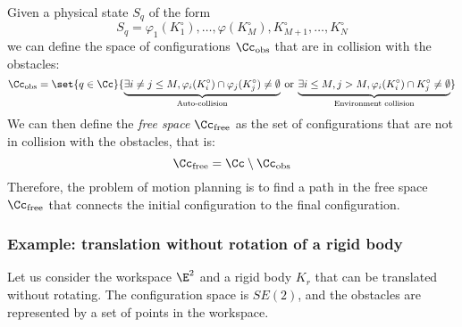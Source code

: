 Given a physical state $S_q$ of the form
\begin{equation*}
    S_q = \varphi_1(K_1^\circ), \dots, \varphi(K_M^\circ), K_{M+1}^\circ, \dots, K_N^\circ
\end{equation*}
we can define the space of configurations $\Cc_{\text{obs}}$ that are in collision with the obstacles:
\begin{equation*}
    \Cc_{\text{obs}} = \set{q\in\Cc}{%
        \underbrace{\exists i\neq j\leq M, \varphi_i(K_i^\circ)\cap \varphi_j(K_j^\circ)\neq\emptyset}_{\text{Auto-collision}}%
        \:\text{or}\:%
        \underbrace{\exists i\leq M, j>M, \varphi_i(K_i^\circ)\cap K_j^\circ\neq\emptyset}_{\text{Environment collision}}%
    }
\end{equation*}
We can then define the \emph{free space} $\Cc_{\text{free}}$ as the set of configurations that are not in collision with the obstacles, that is:
\begin{equation*}
    \Cc_{\text{free}} = \Cc\setminus\Cc_{\text{obs}}
\end{equation*}
Therefore, the problem of motion planning is to find a path in the free space $\Cc_{\text{free}}$ that connects the initial configuration to the final configuration.

\subsubsection{Example: translation without rotation of a rigid body}
Let us consider the workspace $\E^2$ and a rigid body $K_r$ that can be translated without rotating. The configuration space is $SE(2)$, and the obstacles are represented by a set of points in the workspace.

